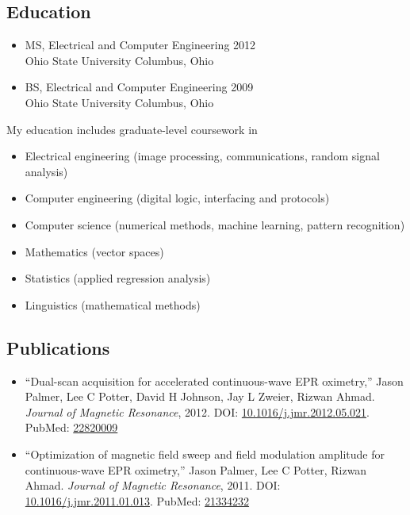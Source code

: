 \documentclass[12pt]{report}
\begin{document}
\subsection*{Education}
\begin{itemize}
\item MS, Electrical and Computer Engineering \hfill 2012 \\
Ohio State University                         \hfill Columbus, Ohio \\

\item BS, Electrical and Computer Engineering \hfill 2009 \\
Ohio State University                         \hfill Columbus, Ohio \\
\end{itemize}

My education includes graduate-level coursework in
\begin{itemize}
\item Electrical engineering (image processing, communications, random signal analysis)
\item Computer engineering (digital logic, interfacing and protocols)
\item Computer science (numerical methods, machine learning, pattern recognition)
\item Mathematics (vector spaces)
\item Statistics (applied regression analysis)
\item Linguistics (mathematical methods)
\end{itemize}

\subsection*{Publications}
\begin{itemize}
\item ``Dual-scan acquisition for accelerated continuous-wave EPR oximetry,''
Jason Palmer, Lee C Potter, David H Johnson, Jay L Zweier, Rizwan Ahmad.
{\it Journal of Magnetic Resonance}, 2012.
DOI: \href{http://dx.doi.org/10.1016/j.jmr.2012.05.021}{10.1016/j.jmr.2012.05.021}.
PubMed: \href{http://www.ncbi.nlm.nih.gov/pubmed/22820009}{22820009}
\item ``Optimization of magnetic field sweep and field modulation amplitude for continuous-wave EPR oximetry,''
Jason Palmer, Lee C Potter, Rizwan Ahmad.
{\it Journal of Magnetic Resonance}, 2011.
DOI: \href{http://dx.doi.org/10.1016/j.jmr.2011.01.013}{10.1016/j.jmr.2011.01.013}.
PubMed: \href{http://www.ncbi.nlm.nih.gov/pubmed/21334232}{21334232}
\end{itemize}
\end{document}
